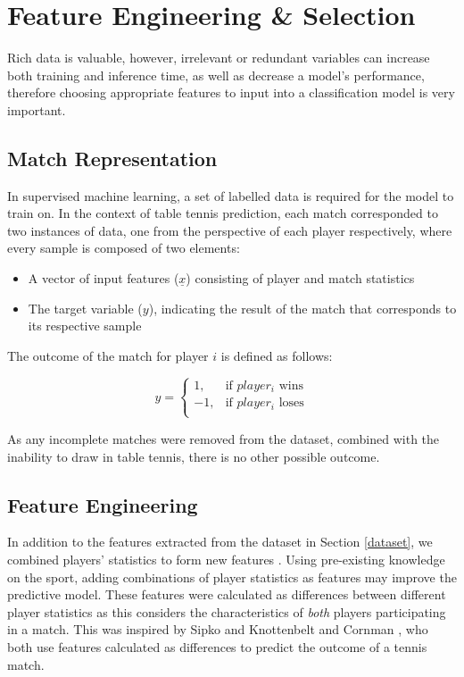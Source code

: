 \section{Feature Engineering \& Selection} \label{features}
Rich data is valuable, however, irrelevant or redundant variables can increase both training and inference time, as well as decrease a model's performance, therefore choosing appropriate features to input into a classification model is very important.

\subsection{Match Representation}
In supervised machine learning, a set of labelled data is required for the model to train on. In the context of table tennis prediction, each match corresponded to two instances of data, one from the perspective of each player respectively, where every sample is composed of two elements:
\begin{itemize}
    \item A vector of input features ($\underline{x}$) consisting of player and match statistics
    \item The target variable ($y$), indicating the result of the match that corresponds to its respective sample
\end{itemize}
The outcome of the match for player $i$ is defined as follows:

\begin{equation}
    y =
    \begin{cases}
    1, &\text{if $player_i$ wins} \\ 
    -1, &\text{if $player_i$ loses} \\
    \end{cases}
\end{equation}
    
As any incomplete matches were removed from the dataset, combined with the inability to draw in table tennis, there is no other possible outcome.

\subsection{Feature Engineering}
In addition to the features extracted from the dataset in Section \ref{dataset}, we combined players' statistics to form new features \cite{barnett2005combining}. Using pre-existing knowledge on the sport, adding combinations of player statistics as features may improve the predictive model. These features were calculated as differences between different player statistics as this considers the characteristics of \textit{both} players participating in a match. This was inspired by Sipko and Knottenbelt \cite{sipko2015machine} and Cornman \etal \cite{cornman2017machine}, who both use features calculated as differences to predict the outcome of a tennis match.

